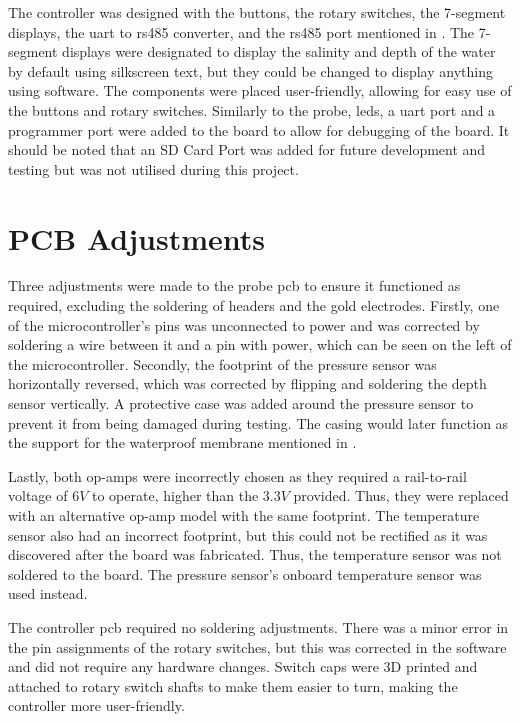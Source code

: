 The controller was designed with the buttons, the rotary switches, the 7-segment displays, the \gls{uart} to \gls{rs485} converter, and the \gls{rs485} port mentioned in .
The 7-segment displays were designated to display the salinity and depth of the water by default using silkscreen text, but they could be changed to display anything using software.
The components were placed user-friendly, allowing for easy use of the buttons and rotary switches.
Similarly to the probe, \glspl{led}, a \gls{uart} port and a programmer port were added to the board to allow for debugging of the board.
It should be noted that an SD Card Port was added for future development and testing but was not utilised during this project.

\section{PCB Adjustments}

Three adjustments were made to the probe \gls{pcb} to ensure it functioned as required, excluding the soldering of headers and the gold electrodes.
Firstly, one of the microcontroller's pins was unconnected to power and was corrected by soldering a wire between it and a pin with power, which can be seen on the left of the microcontroller.
Secondly, the footprint of the pressure sensor was horizontally reversed, which was corrected by flipping and soldering the depth sensor vertically.
A protective case was added around the pressure sensor to prevent it from being damaged during testing.
The casing would later function as the support for the waterproof membrane mentioned in .

Lastly, both op-amps were incorrectly chosen as they required a rail-to-rail voltage of $6V$ to operate, higher than the $3.3V$ provided.
Thus, they were replaced with an alternative op-amp model with the same footprint.
The temperature sensor also had an incorrect footprint, but this could not be rectified as it was discovered after the board was fabricated. 
Thus, the temperature sensor was not soldered to the board.
The pressure sensor's onboard temperature sensor was used instead.

The controller \gls{pcb} required no soldering adjustments.
There was a minor error in the pin assignments of the rotary switches, but this was corrected in the software and did not require any hardware changes.
Switch caps were 3D printed and attached to rotary switch shafts to make them easier to turn, making the controller more user-friendly.

